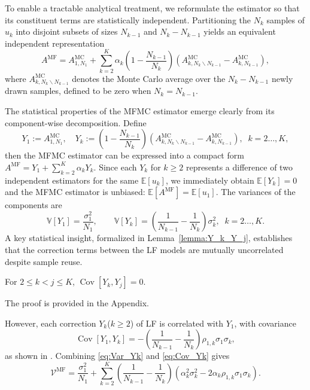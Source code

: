 To enable a tractable analytical treatment, we reformulate the estimator so that its constituent terms are statistically independent. Partitioning the $N_k$ samples of $u_k$ into disjoint subsets of sizes $N_{k-1}$ and $N_k - N_{k-1}$ yields an equivalent independent representation 
%
\begin{equation}\label{eq:MFMC_estimator_independent}
    A^{\text{MF}} = A^{\text{MC}}_{1,N_1} +  \sum_{k=2}^K \alpha_k\!\left(1-\frac{N_{k-1}}{N_k}\right)\left(A^{\text{MC}}_{k,N_k\backslash N_{k-1}}-A^{\text{MC}}_{k,N_{k-1}}\right),
\end{equation}
%
where $A^{\text{MC}}_{k,N_k \backslash N_{k-1}}$ denotes the Monte Carlo average over the $N_k - N_{k-1}$ newly drawn samples, defined to be zero when $N_k = N_{k-1}$. 


The statistical properties of the MFMC estimator emerge clearly from its component-wise decomposition. Define
%
\begin{equation}\label{eq:MFMC_Yk}
Y_1 := A^{\text{MC}}_{1,N_1},\quad 
Y_k := \left(1-\frac{N_{k-1}}{N_k}\right)\!\left(A^{\text{MC}}_{k,N_k\backslash N_{k-1}} - A^{\text{MC}}_{k,N_{k-1}}\right), \;\; k=2\ldots, K,
\end{equation}
%
then the MFMC estimator can be expressed into a compact form $A^{\text{MF}} = Y_1 + \sum_{k=2}^K \alpha_k Y_k$. Since each $Y_k$ for $k\ge2$ represents a difference of two independent estimators for the same $\mathbb{E}[u_k]$, we immediately obtain $\mathbb{E}[Y_k]=0$ and the MFMC estimator is unbiased: $\mathbb{E}[A^{\text{MF}}]=\mathbb{E}[u_1]$. The variances of the components are
%
\begin{equation}\label{eq:Var_Yk}
    \mathbb{V}[Y_1] = \frac{\sigma_1^2}{N_1}, \qquad 
    \mathbb{V}[Y_k] = \left(\frac{1}{N_{k-1}} - \frac{1}{N_k}\right)\sigma_k^2, \;\; k=2\ldots, K.
\end{equation}
%
A key statistical insight, formalized in Lemma~\ref{lemma:Y_k_Y_j}, establishes that the correction terms between the LF models are mutually uncorrelated despite sample reuse.
%
\begin{lemma}\label{lemma:Y_k_Y_j}
For $2\le k<j\le K$, 
$\operatorname{Cov} [Y_k,Y_j ]=0$.
\end{lemma}
%
The proof is provided in the Appendix.

However, each correction $Y_k$($k\ge2$) of LF is correlated with $Y_1$, with covariance
\begin{equation}\label{eq:Cov_Yk}
\operatorname{Cov}[Y_1,Y_k] = -\!\left(\frac{1}{N_{k-1}} - \frac{1}{N_k}\right)\rho_{1,k}\sigma_1\sigma_k,
\end{equation}
as shown in \cite[Lemma~3.2]{PeWiGu:2016}. Combining \eqref{eq:Var_Yk} and \eqref{eq:Cov_Yk} gives
%
\begin{equation}\label{eq:MFMC_variance}
    \mathcal{V}^{\text{MF}}
    =\frac{\sigma_1^2}{N_1} 
    + \sum_{k=2}^K \left(\frac{1}{N_{k-1}} - \frac{1}{N_k}\right)\!\left(\alpha_k^2\sigma_k^2 - 2\alpha_k\rho_{1,k}\sigma_1\sigma_k\right).
\end{equation}
%

